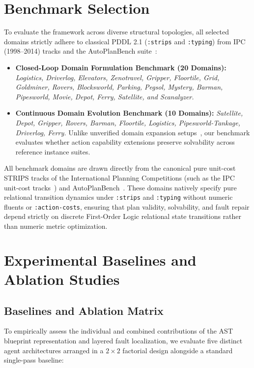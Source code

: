 \documentclass[11pt,a4paper]{article}
\begin{document}
\section{Benchmark Selection}
To evaluate the framework across diverse structural topologies, all selected domains strictly adhere to classical PDDL 2.1 (\texttt{:strips} and \texttt{:typing}) from IPC (1998--2014) tracks and the AutoPlanBench suite~\cite{stein2023autoplanbench, potassco_pddl_instances}:
\begin{itemize}[nosep, leftmargin=1.5em]
    \item \textbf{Closed-Loop Domain Formulation Benchmark (20 Domains):} \textit{Logistics, Driverlog, Elevators, Zenotravel, Gripper, Floortile, Grid, Goldminer, Rovers, Blocksworld, Parking, Pegsol, Mystery, Barman, Pipesworld, Movie, Depot, Ferry, Satellite, and Scanalyzer.}
    \item \textbf{Continuous Domain Evolution Benchmark (10 Domains):} \textit{Satellite, Depot, Gripper, Rovers, Barman, Floortile, Logistics, Pipesworld-Tankage, Driverlog, Ferry.} Unlike unverified domain expansion setups~\cite{huang2025plan2evolve}, our benchmark evaluates whether action capability extensions preserve solvability across reference instance suites.
\end{itemize}
All benchmark domains are drawn directly from the canonical pure unit-cost STRIPS tracks of the International Planning Competitions (such as the IPC unit-cost tracks~\cite{potassco_pddl_instances}) and AutoPlanBench~\cite{stein2023autoplanbench}. These domains natively specify pure relational transition dynamics under \texttt{:strips} and \texttt{:typing} without numeric fluents or \texttt{:action-costs}, ensuring that plan validity, solvability, and fault repair depend strictly on discrete First-Order Logic relational state transitions rather than numeric metric optimization.

\section{Experimental Baselines and Ablation Studies}
\subsection{Baselines and Ablation Matrix}
To empirically assess the individual and combined contributions of the AST blueprint representation and layered fault localization, we evaluate five distinct agent architectures arranged in a $2 \times 2$ factorial design alongside a standard single-pass baseline:
\end{document}
